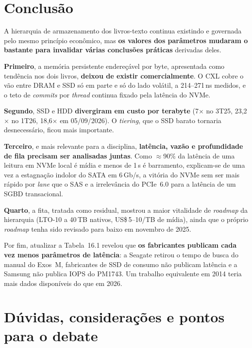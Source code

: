 \documentclass[11pt,a4paper]{article}
\newcommand{\us}{\,\textmu s}
\begin{document}
\section{Conclusão}

A hierarquia de armazenamento dos livros-texto continua existindo e governada pelo mesmo
princípio econômico, mas \textbf{os valores dos parâmetros mudaram o bastante para invalidar
várias conclusões práticas} derivadas deles.

\textbf{Primeiro}, a memória persistente endereçável por byte, apresentada como tendência nos
dois livros, \textbf{deixou de existir comercialmente}. O CXL cobre o vão entre DRAM e SSD só
em parte e só do lado volátil, a 214--271\,ns medidos, e o teto de \emph{commits} por
\emph{thread} continua fixado pela latência do NVMe.

\textbf{Segundo}, SSD e HDD \textbf{divergiram em custo por terabyte} (7$\times$ no 3T25,
23,2$\times$ no 1T26, 18,6$\times$ em 05/09/2026). O \emph{tiering}, que o SSD barato
tornaria desnecessário, ficou mais importante.

\textbf{Terceiro}, e mais relevante para a disciplina, \textbf{latência, vazão e
profundidade de fila precisam ser analisadas juntas}. Como $\approx$90\% da latência de uma
leitura em NVMe local é mídia e menos de 1\us{} é barramento, explicam-se de uma vez a
estagnação indolor do SATA em 6\,Gb/s, a vitória do NVMe sem ser mais rápido por \emph{lane}
que o SAS e a irrelevância do PCIe~6.0 para a latência de um SGBD transacional.

\textbf{Quarto}, a fita, tratada como residual, mostrou a maior vitalidade de \emph{roadmap}
da hierarquia (LTO-10 a 40\,TB nativos, US\$\,5--10/TB de mídia), ainda que o próprio
\emph{roadmap} tenha sido revisado para baixo em novembro de 2025.

Por fim, atualizar a Tabela~16.1 revelou que \textbf{os fabricantes publicam cada vez menos
parâmetros de latência}: a Seagate retirou o tempo de busca do manual do Exos~M, fabricantes de
SSD de consumo não publicam latência e a Samsung não publica IOPS do PM1743. Um trabalho
equivalente em 2014 teria mais dados disponíveis do que em 2026.

\section{Dúvidas, considerações e pontos para o debate}
\end{document}
